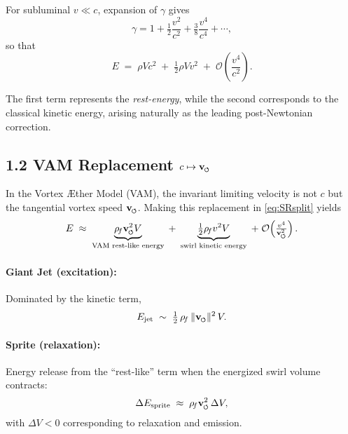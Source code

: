 \documentclass[reprint,aps,onecolumn,nofootinbib]{revtex4-2}
\newcommand{\swirlarrow}{%
    \mathchoice{\mkern-2mu\scriptstyle\boldsymbol{\circlearrowleft}}%
    {\mkern-2mu\scriptstyle\boldsymbol{\circlearrowleft}}%
    {\mkern-2mu\scriptscriptstyle\boldsymbol{\circlearrowleft}}%
    {\mkern-2mu\scriptscriptstyle\boldsymbol{\circlearrowleft}}%
}
\newcommand{\vswirl}{\mathbf{v}_{\swirlarrow}}
\newcommand{\vnorm}{\lVert \vswirl \rVert}               %
\newcommand{\rhof}{\rho_{\!f}}                           %
\newcommand{\Ce}{\vswirl}
\begin{document}
        For subluminal $v \ll c$, expansion of $\gamma$ gives
        \[
            \gamma = 1 + \tfrac{1}{2}\frac{v^2}{c^2}
            + \tfrac{3}{8}\frac{v^4}{c^4} + \cdots,
        \]
        so that
        \begin{equation}
        E \;=\; \rho V c^2
        \;+\; \tfrac{1}{2}\rho V v^2
        \;+\; \mathcal{O}\!\left(\frac{v^4}{c^2}\right).
        \label{eq:SRsplit}
        \end{equation}

        The first term represents the \emph{rest-energy},
        while the second corresponds to the classical kinetic energy,
        arising naturally as the leading post-Newtonian correction.

    \subsection*{1.2 VAM Replacement \texorpdfstring{$c \mapsto \Ce$}{c -> C\_e}}

        In the Vortex \AE ther Model (VAM), the invariant limiting velocity
        is not $c$ but the tangential vortex speed $\Ce$. Making this
        replacement in \eqref{eq:SRsplit} yields
        \begin{equation}
        E \;\approx\;
        \underbrace{\rhof \Ce^2 V}_{\text{VAM rest-like energy}}
        \;+\;
        \underbrace{\tfrac{1}{2}\rhof v^2 V}_{\text{swirl kinetic energy}}
        \;+\;
        \mathcal{O}\!\left(\tfrac{v^4}{\Ce^2}\right).
        \label{eq:VAMsplit}
        \end{equation}

        \paragraph{Giant Jet (excitation):}
            Dominated by the kinetic term,
            \begin{equation}
            E_{\text{jet}}
            \;\sim\;
            \tfrac{1}{2}\,\rhof\,\vnorm^2\,V.
            \label{eq:jet}
            \end{equation}

        \paragraph{Sprite (relaxation):}
            Energy release from the ``rest-like'' term when the energized
            swirl volume contracts:
            \begin{equation}
            \Delta E_{\text{sprite}}
            \;\approx\;
            \rhof \Ce^2 \,\Delta V,
            \label{eq:sprite}
            \end{equation}
            with $\Delta V < 0$ corresponding to relaxation
            and emission.
\end{document}
